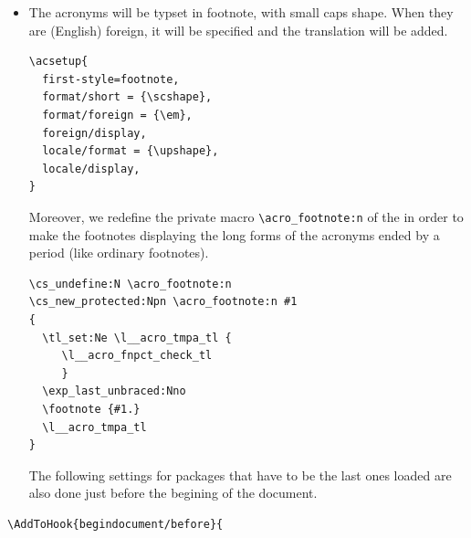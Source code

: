 \documentclass{letgut}
\begin{document}
\begin{itemize}
\begin{lstlisting}
\defbibheading{title}[\refname]{%
  \title{#1}}
\defbibheading{subtitle}[\refname]{%
  \subtitle{#1}}
\end{lstlisting}
\item The acronyms will be typset in footnote, with small caps shape. When they are
(English) foreign, it will be specified and the translation will be added.
\begin{lstlisting}
\acsetup{
  first-style=footnote,
  format/short = {\scshape},
  format/foreign = {\em},
  foreign/display,
  locale/format = {\upshape},
  locale/display,
}
\end{lstlisting}
 Moreover, we redefine the private macro \lstinline+\acro_footnote:n+ of the
 in order to make the footnotes displaying the long forms of the
acronyms ended by a period (like ordinary footnotes).
\begin{lstlisting}
\cs_undefine:N \acro_footnote:n
\cs_new_protected:Npn \acro_footnote:n #1
{
  \tl_set:Ne \l__acro_tmpa_tl {
     \l__acro_fnpct_check_tl
     }
  \exp_last_unbraced:Nno
  \footnote {#1.}
  \l__acro_tmpa_tl
}
\end{lstlisting}

The following settings for packages that have to be the last ones loaded are
also done just before the begining of the document.
\end{itemize}

\begin{lstlisting}
\AddToHook{begindocument/before}{
\end{lstlisting}
\end{document}
